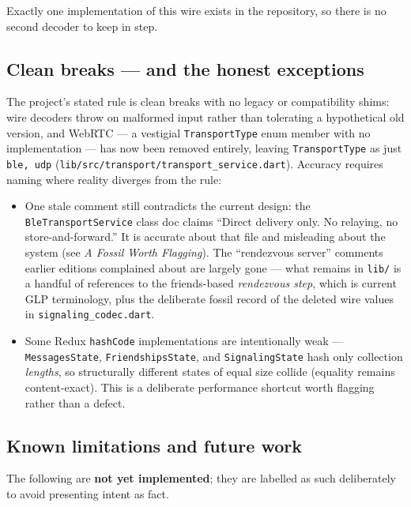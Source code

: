 \documentclass[11pt]{report}
\newcommand{\code}[1]{\texttt{\small #1}}
\begin{document}
Exactly one implementation of this wire exists in the repository, so there is no second decoder to keep in step.

\subsection{Clean breaks --- and the honest exceptions}

The project's stated rule is clean breaks with no legacy or compatibility shims: wire decoders throw on malformed input rather than tolerating a hypothetical old version, and WebRTC --- a vestigial \code{TransportType} enum member with no implementation --- has now been removed entirely, leaving \code{TransportType} as just \code{ble, udp} (\code{lib/src/transport/transport_service.dart}). Accuracy requires naming where reality diverges from the rule:

\begin{itemize}
  \item One stale comment still contradicts the current design: the \code{BleTransportService} class doc claims ``Direct delivery only. No relaying, no store-and-forward.'' It is accurate about that file and misleading about the system (see \emph{A Fossil Worth Flagging}). The ``rendezvous server'' comments earlier editions complained about are largely gone --- what remains in \code{lib/} is a handful of references to the friends-based \emph{rendezvous step}, which is current GLP terminology, plus the deliberate fossil record of the deleted wire values in \code{signaling_codec.dart}.
  \item Some Redux \code{hashCode} implementations are intentionally weak --- \code{MessagesState}, \code{FriendshipsState}, and \code{SignalingState} hash only collection \emph{lengths}, so structurally different states of equal size collide (equality remains content-exact). This is a deliberate performance shortcut worth flagging rather than a defect.
\end{itemize}

\subsection{Known limitations and future work}

The following are \textbf{not yet implemented}; they are labelled as such deliberately to avoid presenting intent as fact.
\end{document}
